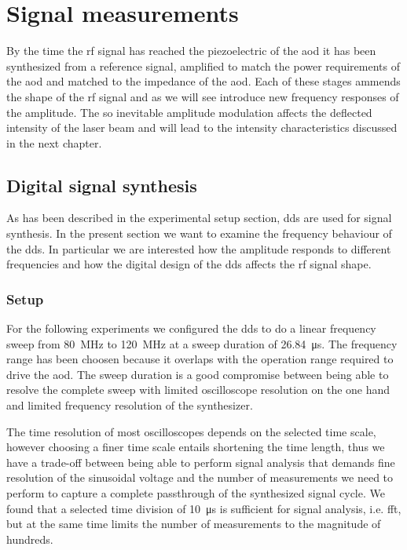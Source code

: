 \chapter{Signal measurements}

By the time the \gls{rf} signal has reached the piezoelectric of the
\gls{aod} it has been synthesized from a reference signal, amplified to match
the power requirements of the \gls{aod} and matched to the impedance of the
\gls{aod}. Each of these stages ammends the shape of the \gls{rf} signal and
as we will see introduce new frequency responses of the amplitude. The so
inevitable amplitude modulation affects the deflected intensity of the laser
beam and will lead to the intensity characteristics discussed in the next
chapter.

\section{Digital signal synthesis}

As has been described in the experimental setup section, \gls{dds} are used
for signal synthesis. In the present section we want to examine the
frequency behaviour of the \gls{dds}. In particular we are interested how the
amplitude responds to different frequencies and how the digital design of the
\gls{dds} affects the \gls{rf} signal shape.

\subsection{Setup}
\label{subsec:signal_synthesis_setup}

For the following experiments we configured the \gls{dds} to do a linear
frequency sweep from \SI{80}{\mega\hertz} to \SI{120}{\mega\hertz} at a sweep
duration of \SI{26.84}{\micro\second}. The frequency range has been choosen
because it overlaps with the operation range required to drive the \gls{aod}.
The sweep duration is a good compromise between being able to resolve the
complete sweep with limited oscilloscope resolution on the one hand and
limited frequency resolution of the synthesizer.

The time resolution of most oscilloscopes depends on the selected time scale,
however choosing a finer time scale entails shortening the time length, thus
we have a trade-off between being able to perform signal analysis that demands
fine resolution of the sinusoidal voltage and the number of measurements we
need to perform to capture a complete passthrough of the synthesized signal
cycle. We found that a selected time division of \SI{10}{\micro\second} is
sufficient for signal analysis, i.e. \gls{fft}, but at the same time limits
the number of measurements to the magnitude of hundreds.

